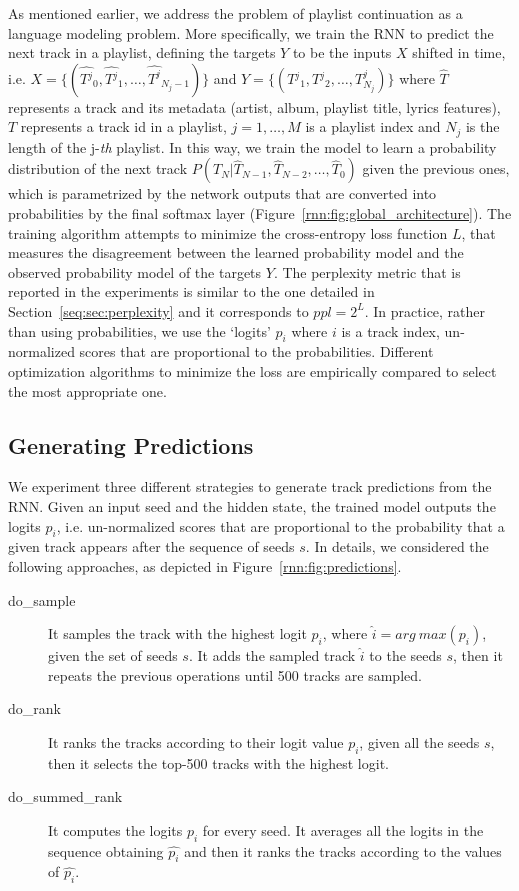 As mentioned earlier, we address the problem of playlist continuation as a language modeling problem. More specifically, we train the RNN to predict the next track in a playlist, defining the targets $Y$ to be the inputs $X$ shifted in time, i.e. $X = \{(\hat{T{^j}}_0, \hat{T{^j}}_1, \dots, \hat{T^{j}}_{N_j -1})\}$ and $Y = \{(T{^j}_1, T{^j}_2, \dots, T^{j}_{N_j})\}$ where $\hat{T}$ represents a track and its metadata (artist, album, playlist title, lyrics features), $T$ represents a track id in a playlist, $j = 1, \dots, M$ is a playlist index and $N_j$ is the length of the j-\textit{th} playlist. In this way, we train the model to learn a probability distribution of the next track $P (T_N | \hat{T}_{N-1}, \hat{T}_{N-2}, \dots, \hat{T}_{0})$ given the previous ones, which is parametrized by the network outputs that are converted into probabilities by the final softmax layer (Figure~\ref{rnn:fig:global_architecture}). The training algorithm attempts to minimize the cross-entropy loss function $L$, that measures the disagreement between the learned probability model and the observed probability model of the targets $Y$. The perplexity metric that is reported in the experiments is similar to the one detailed in Section~\ref{seq:sec:perplexity} and it corresponds to $ppl = 2^{L}$. In practice, rather than using probabilities, we use the `logits' $p_i$ where $i$ is a track index, un-normalized scores that are proportional to the probabilities. Different optimization algorithms to minimize the loss are empirically compared to select the most appropriate one.

\subsection{Generating Predictions}
\label{rnn:sec:generation}

We experiment three different strategies to generate track predictions from the RNN. Given an input seed and the hidden state, the trained model outputs the logits $p_i$, i.e. un-normalized scores that are proportional to the probability that a given track appears after the sequence of seeds $s$. In details, we considered the following approaches, as depicted in Figure~\ref{rnn:fig:predictions}.

\begin{description}
\item[do\_sample] It samples the track with the highest logit $p_i$, where $\hat{i} = arg\ max ({p_i})$, given the set of seeds $s$. It adds the sampled track $\hat{i}$ to the seeds $s$, then it repeats the previous operations until 500 tracks are sampled.
\item[do\_rank] It ranks the tracks according to their logit value $p_i$, given all the seeds $s$, then it selects the top-500 tracks with the highest logit.
\item[do\_summed\_rank] It computes the logits $p_i$ for every seed. It averages all the logits in the sequence obtaining $\hat{p_i}$ and then it ranks the tracks according to the values of $\hat{p_i}$.
\end{description}

